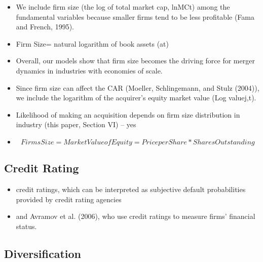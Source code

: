 \documentclass[12pt]{article}
\begin{document}
\begin{itemize}
        \item We include firm size (the log of total market cap, lnMCt) among the fundamental variables because smaller firms tend to be less profitable (Fama and French, 1995).\citep{Fama2006}

        \item Firm Size= natural logarithm of book assets (at) \citep{DUCHIN2010}

        \item Overall, our models show that firm size becomes the driving force for merger dynamics in industries with economies of scale. \citep{Gorton2009}

        \item Since firm size can affect the CAR (Moeller, Schlingemann, and Stulz (2004)), we include the logarithm of the acquirer’s equity market value (Log valuej,t). \citep{Gorton2009}

        \item Likelihood of making an acquisition depends on firm size distribution in industry (this paper, Section VI) -- yes \citep{Gorton2009}

        \item \citep{LyonJ.D.BarberB.M.&Tsai1999}
        \begin{displaymath}
            Firms Size = Market Value of Equity = Price per Share * Shares Outstanding
        \end{displaymath}

    \end{itemize}
\subsection{Credit Rating}

    \begin{itemize}
        \item credit ratings, which can be interpreted as subjective default probabilities provided by credit rating agencies \citep{Campbell2008}
        \item and Avramov et al. (2006), who use credit ratings to measure firms’ financial status. \citep{Campbell2008}
    \end{itemize}


\subsection{Diversification}
\end{document}
